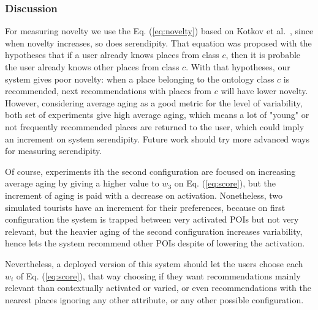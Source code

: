 \vspace{-0.2cm}
\subsubsection{Discussion}

For measuring novelty we use the Eq. (\ref{eq:novelty}) based on Kotkov et al.~\cite{kotkov2016survey}, since when novelty increases, so does serendipity. That equation was proposed with the hypotheses that if a user already knows places from class $c$, then it is probable the user already knows other places from class $c$. With that hypotheses, our system gives poor novelty: when a place belonging to the ontology class $c$ is recommended, next recommendations with places from $c$ will have lower novelty. However, considering average aging as a good metric for the level of variability, both set of experiments
give high average aging, which means a lot of "young" or not frequently recommended places are returned to the user, which could imply an increment on system serendipity. Future work should try more advanced ways for measuring serendipity.

Of course, experiments ith the second configuration 
are focused on increasing average aging by giving a higher value to $w_3$ on Eq. (\ref{eq:score}), but the increment of aging is paid with a decrease
on activation. Nonetheless, two simulated tourists have an increment for their preferences, because on first configuration the system is trapped between very activated POIs but not very relevant, but the heavier aging of the second configuration increases variability, hence lets the system recommend other POIs despite of lowering the activation. 

Nevertheless, a deployed version of this system should let the users choose each $w_i$ of Eq. (\ref{eq:score}), that way choosing if they want recommendations mainly relevant than contextually activated or varied, or even recommendations with the nearest places ignoring any other attribute, or any other possible configuration.